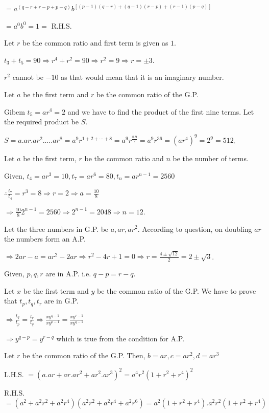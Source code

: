   $= a^{(q - r + r - p + p - q)}b^{[(p - 1)(q - r) + (q - 1)(r - p) + (r - 1)(p - q)]}$

  $= a^0b^0 = 1 =$ R.H.S.
\item Let $r$ be the common ratio and first term is given as $1$.

  $t_3 + t_5 = 90 \Rightarrow r^4 + r^2 = 90 \Rightarrow r^2 = 9 \Rightarrow r = \pm 3$.

  $r^2$ cannot be $-10$ as that would mean that it is an imaginary number.
\item Let $a$ be the first term and $r$ be the common ratio of the G.P.

  Gibem $t_5 = ar^4 = 2$ and we have to find the product of the first nine terms. Let the required product be $S$.

  $S = a.ar.ar^2.\ldots.ar^8 = a^9r^{1 + 2 + \cdots + 8} = a^9r^{\tfrac{8.9}{2}} = a^9r^{36} = (ar^4)^9 = 2^9 = 512$.
\item Let $a$ be the first term, $r$ be the common ratio and $n$ be the number of terms.

  Given, $t_4 = ar^3 = 10, t_7 = ar^6 = 80, t_n = ar^{n - 1} = 2560$

  $\therefore \frac{t_7}{t_4} = r^3 = 8 \Rightarrow r = 2 \Rightarrow a = \frac{10}{8}$

  $\Rightarrow \frac{10}{8}2^{n- 1} = 2560 \Rightarrow 2^{n - 1} = 2048 \Rightarrow n = 12$.
\item Let the three numbers in G.P. be $a, ar, ar^2$. According to question, on doubling $ar$ the numbers form an A.P.

  $\Rightarrow 2ar - a = ar^2 - 2ar \Rightarrow r^2 - 4r + 1 = 0 \Rightarrow r = \frac{4\pm\sqrt{12}}{2} = 2\pm\sqrt{3}$.
\item Given, $p, q, r$ are in A.P. i.e. $q - p = r - q$.

  Let $x$ be the first term and $y$ be the common ratio of the G.P. We have to prove that $t_p, t_q, t_r$ are in G.P.

  $\Rightarrow \frac{t_q}{t_p} = \frac{t_r}{t_q} \Rightarrow \frac{xy^{q - 1}}{xy ^{p - 1}} = \frac{xy^{r - 1}}{xy^{q - 1}}$

  $\Rightarrow y^{q - p} = y^{r - q}$ which is true from the condition for A.P.
\item Let $r$ be the common ratio of the G.P. Then, $b = ar, c = ar^2, d = ar^3$

  L.H.S. $= (a.ar + ar.ar^2 + ar^2.ar^3)^2 = a^4r^2(1 + r^2 + r^4)^2$

  R.H.S. $= (a^2 + a^2r^2 + a^2r^4)(a^2r^2 + a^2r^4 + a^2r^6) = a^2(1 + r^2 + r^4).a^2r^2(1 + r^2 + r^4)$

